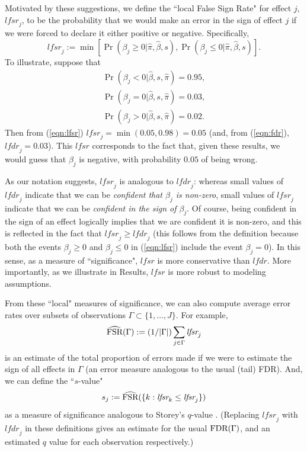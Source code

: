 \documentclass[11pt]{article}
\def\lfdr{\textit{lfdr}}
\def\lfsr{\textit{lfsr}}
\def\bhat{\hat{\beta}}
\begin{document}
Motivated by these suggestions, we define the ``local False Sign Rate" for effect $j$, $\lfsr_j$, to be the probability that we
would make an error in the sign of effect $j$ if we were forced to declare it either positive or negative. Specifically,
\begin{equation} \label{eqn:lfsr}
\lfsr_j := \min[ \Pr(\beta_j \geq 0| \hat\pi, \bhat, s), \Pr(\beta_j \leq 0| \hat\pi, \bhat, s) ].
\end{equation}
To illustrate, suppose that 
\begin{gather*}
\Pr(\beta_j < 0| \bhat, s, \hat\pi)=0.95, \\
\Pr(\beta_j =0| \bhat, s, \hat\pi) = 0.03, \\
\Pr(\beta_j >0| \bhat, s, \hat\pi) = 0.02.
\end{gather*} 
Then 
from (\ref{eqn:lfsr}) $\lfsr_j=\min(0.05,0.98)=0.05$ (and, from (\ref{eqn:fdr}), $\lfdr_j=0.03$). This $\lfsr$ corresponds to the fact that, given these results, 
we would guess that $\beta_j$ is negative, with probability $0.05$ of being wrong. 

As our notation suggests, $\lfsr_j$ is analogous to $\lfdr_j$: whereas small values of $\lfdr_j$ indicate that we can be {\it confident that $\beta_j$ is non-zero}, 
small values of $\lfsr_j$ indicate that we can be {\it confident in the sign of $\beta_j$}. 
Of course, being confident in the sign of an effect logically implies that we are confident it is non-zero, and
this is reflected in the fact that $\lfsr_j \geq \lfdr_j$ 
(this follows from the definition because both the events $\beta_j \geq 0$
and $\beta_j \leq 0$ in (\ref{eqn:lfsr}) include the event $\beta_j=0$).
In this sense, as a measure of ``significance", $\lfsr$ is more conservative than $\lfdr$. More importantly, as we illustrate in Results,
$\lfsr$ is more robust to modeling assumptions.

From these ``local" measures of significance, we can also compute average error rates over subsets of observations
$\Gamma \subset \{1,\dots,J\}$. For example, 
\begin{equation} \label{eqn:FSRhat}
\widehat\FSR(\Gamma):= (1/|\Gamma|) \sum_{j \in \Gamma} \lfsr_j 
\end{equation}
is an estimate of the total proportion of errors made if we were to estimate the sign of all effects in $\Gamma$
(an error measure analogous to the usual (tail) FDR).
And, we can define the ``$s$-value" 
\begin{equation} \label{eqn:qvalue}
s_j := \widehat \FSR(\{k: \lfsr_k \leq \lfsr_j\}) 
\end{equation}
as a measure of significance analogous to Storey's $q$-value \cite{storey.03}.
(Replacing $\lfsr_j$ with $\lfdr_j$ in these definitions gives an estimate for the usual $\text{FDR}(\Gamma)$, and an estimated $q$ value for each observation respectively.)
\end{document}
